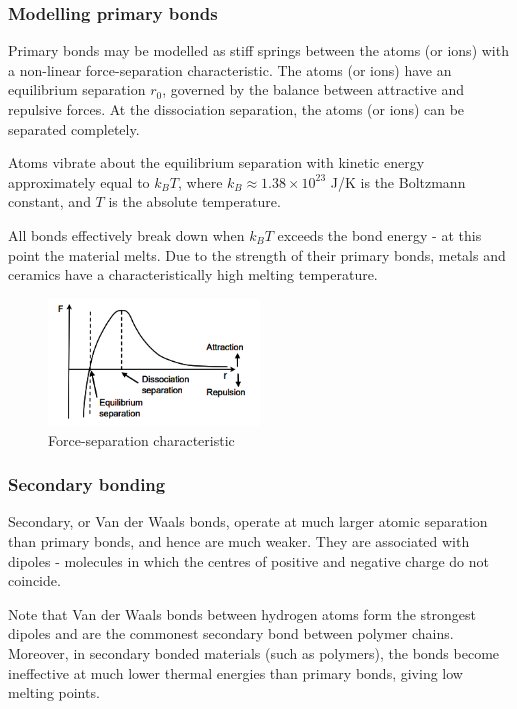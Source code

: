 \documentclass{article}
\begin{document}
\subsubsection{Modelling primary bonds}

Primary bonds may be modelled as stiff springs between the atoms (or ions) with a non-linear force-separation characteristic. The atoms (or ions) have an equilibrium separation $r_0$, governed by the balance between attractive and repulsive forces. At the dissociation separation, the atoms (or ions) can be separated completely. 

Atoms vibrate about the equilibrium separation with kinetic energy approximately equal to $k_BT$, where $k_B \approx 1.38 \times 10^{23}$ J/K is the Boltzmann constant, and $T$ is the absolute temperature. 

All bonds effectively break down when $k_BT$ exceeds the bond energy - at this point the material melts. Due to the strength of their primary bonds, metals and ceramics have a characteristically high melting temperature.

\begin{figure}[ht!]
    \centering
    \includegraphics[width = 0.5\textwidth]{images/bond1.png}
    \caption{Force-separation characteristic}
    \label{fig:enter-label}
\end{figure}

\subsubsection{Secondary bonding}

Secondary, or Van der Waals bonds, operate at much larger atomic separation than primary bonds, and hence are much weaker. They are associated with dipoles - molecules in which the centres of positive and negative charge do not coincide.

Note that Van der Waals bonds between hydrogen atoms form the strongest dipoles and are the commonest secondary bond between polymer chains. Moreover, in secondary bonded materials (such as polymers), the bonds become ineffective at much lower thermal energies than primary bonds, giving low melting points.
\end{document}
